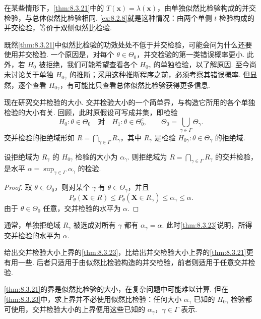 \begin{example}[一种等价性]\label{ex:8.3.22}
在某些情形下，\autoref{thm:8.3.21}中的 $T(\boldsymbol x)=\lambda(\boldsymbol x)$，由单独似然比检验构成的并交检验，与总体似然比检验相同. \autoref{ex:8.2.8}就是这种情况：由两个单侧 $t$ 检验构成的并交检验，等价于双侧似然比检验.
\end{example}
既然\autoref{thm:8.3.21}中似然比检验的功效处处不低于并交检验，可能会问为什么还要使用并交检验. 一个原因是，对每个 $\theta\in\Theta_0$，并交检验的第一类错误概率更小. 此外，若 $H_0$ 被拒绝，我们可能希望查看各个 $H_{0\gamma}$ 的单独检验，以了解原因. 至今尚未讨论关于单独 $H_{0\gamma}$ 的推断；采用这种推断程序之前，必须考察其错误概率. 但显然，逐个查看 $H_{0\gamma}$，有可能比只查看总体似然比检验获得更多信息.

现在研究交并检验的大小. 交并检验大小的一个简单界，与构造它所用的各个单独检验的大小有关. 回顾，此时原假设可写成并集，即检验
$$H_0:\theta\in\Theta_0\quad\text{对}\quad H_1:\theta\in\Theta_0^c,\qquad
\Theta_0=\bigcup_{\gamma\in\Gamma}\Theta_\gamma.$$
交并检验的拒绝域形如 $R=\bigcap_{\gamma\in\Gamma}R_\gamma$，其中 $R_\gamma$ 是检验 $H_{0\gamma}:\theta\in\Theta_\gamma$ 的拒绝域.
\begin{theorem}\label{thm:8.3.23}
设拒绝域为 $R_\gamma$ 的 $H_{0\gamma}$ 检验的大小为 $\alpha_\gamma$. 则拒绝域为 $R=\bigcap_{\gamma\in\Gamma}R_\gamma$ 的交并检验，是水平 $\alpha=\sup_{\gamma\in\Gamma}\alpha_\gamma$ 的检验.
\end{theorem}
\begin{proof}
取 $\theta\in\Theta_0$，则对某个 $\gamma$ 有 $\theta\in\Theta_\gamma$，并且
$$P_\theta(\boldsymbol X\in R)\le P_\theta(\boldsymbol X\in R_\gamma)\le\alpha_\gamma\le\alpha.$$
由于 $\theta\in\Theta_0$ 任意，交并检验的水平为 $\alpha$.
\end{proof}
通常，单独拒绝域 $R_\gamma$ 被选成对所有 $\gamma$ 都有 $\alpha_\gamma=\alpha$. 此时\autoref{thm:8.3.23}说明，所得交并检验的水平为 $\alpha$.

给出交并检验大小上界的\autoref{thm:8.3.23}，比给出并交检验大小上界的\autoref{thm:8.3.21}更有用一些. 后者只适用于由似然比检验构造的并交检验，前者则适用于任意交并检验.

\autoref{thm:8.3.21}的界是似然比检验的大小，在复杂问题中可能难以计算. 但在\autoref{thm:8.3.23}中，求上界并不必使用似然比检验：任何大小 $\alpha_\gamma$ 已知的 $H_{0\gamma}$ 检验都可使用，交并检验大小的上界便用这些已知的 $\alpha_\gamma$，$\gamma\in\Gamma$ 表示.

